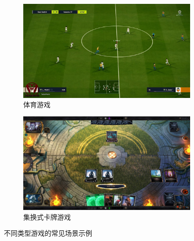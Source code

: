 \begin{figure}[ht]
\begin{subfigure}[t]{0.4\linewidth}
  \centering
  \includegraphics[width=\linewidth]{figures/chap03/game_example/sport_game.png}
  \caption{体育游戏}
  \label{fig-sport-game}
\end{subfigure}%
\begin{subfigure}[t]{0.4\linewidth}
  \centering
  \includegraphics[width=\linewidth]{figures/chap03/game_example/chess_game.png}
  \caption{集换式卡牌游戏}
  \label{fig-chess-game}
\end{subfigure}

\caption{不同类型游戏的常见场景示例}
\label{fig-game-sample}
\end{figure}
